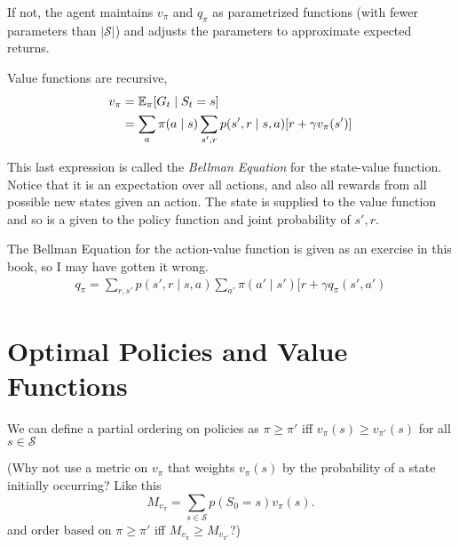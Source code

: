 \documentclass[a4paper]{report}
\begin{document}
If not, the agent maintains $v_{\pi}$ and $q_{\pi}$ as parametrized functions (with fewer parameters than $|\mathcal{S}|$) and adjusts the parameters to approximate expected returns.

Value functions are recursive,
\begin{equation}
  \begin{aligned}  
    v_{\pi} {} & = \mathbb{E}_{\pi}[G_t \mid S_t=s] \\
             & = \sum_a \pi(a \mid s) \sum_{s',r}p(s',r \mid s,a)[r + \gamma v_{\pi}(s')]
  \end{aligned}
\end{equation}
 
This last expression is called the \textit{Bellman Equation} for the state-value function. Notice that it is an expectation over all actions, and also all rewards from all possible new states given an action. The state is supplied to the value function and so is a given to the policy function and joint probability of $s', r$.

The Bellman Equation for the action-value function is given as an exercise in this book, so I may have gotten it wrong.
\begin{equation}
  \begin{aligned}  
    q_{\pi} = \sum_{r,s'} p(s',r \mid s,a) \sum_{a'}\pi(a'\mid s')[r+\gamma q_{\pi}(s',a')
  \end{aligned}
\end{equation}

\section{Optimal Policies and Value Functions}
We can define a partial ordering on policies as $\pi \geq \pi'$ iff $v_{\pi}(s) \geq v_{\pi'}(s)$ for all $s \in \mathcal{S}$

(Why not use a metric on $v_{\pi}$ that weights $v_{\pi}(s)$ by the probability of a state initially occurring? Like this
\[
  M_{v_{\pi}} = \sum_{s\in\mathcal{S}} p(S_0=s)v_{\pi}(s)
.\] 
and order based on $\pi \geq \pi'$ iff $M_{v_{\pi}} \geq M_{v_{\pi'}}$?)
\end{document}
